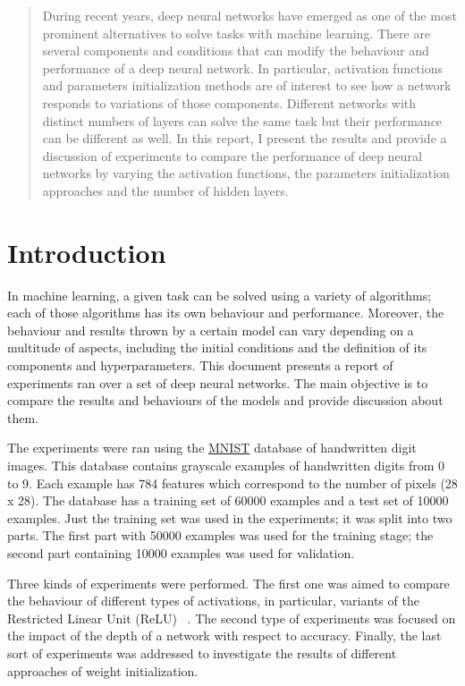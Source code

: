 \documentclass{article}
\def\studentNumber{s1700260}
\begin{document}
 

\twocolumn[
\mlptitle{MLP Coursework 1: Activation Functions}

\centerline{\studentNumber}

\vskip 7mm
]

\begin{abstract} 
During recent years, deep neural networks have emerged as one of the most prominent alternatives to solve tasks with machine learning. There are several components and conditions that can modify the behaviour and performance of a deep neural network. In particular, activation functions and parameters initialization methods are of interest to see how a network responds to variations of those components. Different networks with distinct numbers of layers can solve the same task but their performance can be different as well. In this report, I present the results and provide a discussion of experiments to compare the performance of deep neural networks by varying the activation functions, the parameters initialization approaches and the number of hidden layers.
\end{abstract} 

\section{Introduction}
\label{sec:intro}
In machine learning, a given task can be solved using a variety of algorithms; each of those algorithms has its own behaviour and performance. Moreover, the behaviour and results thrown by a certain model can vary depending on a multitude of aspects, including the initial conditions and the definition of its components and hyperparameters. This document presents a report of experiments ran over a set of deep neural networks. The main objective is to compare the results and behaviours of the models and provide discussion about them.

The experiments were ran using the \href{http://yann.lecun.com/exdb/mnist/}{MNIST} database of handwritten digit images. This database contains grayscale examples of handwritten digits from 0 to 9. Each example has 784 features which correspond to the number of pixels (28 x 28). The database has a training set of 60000 examples and a test set of 10000 examples. Just the training set was used in the experiments; it was split into two parts. The first part with 50000 examples was used for the training stage; the second part containing 10000 examples was used for validation.

Three kinds of experiments were performed. The first one was aimed to compare the behaviour of different types of activations, in particular, variants of the Restricted Linear Unit (ReLU) ~\citep{act_relu}. The second type of experiments was focused on the impact of the depth of a network with respect to accuracy. Finally, the last sort of experiments was addressed to investigate the results of different approaches of weight initialization.
\end{document}
